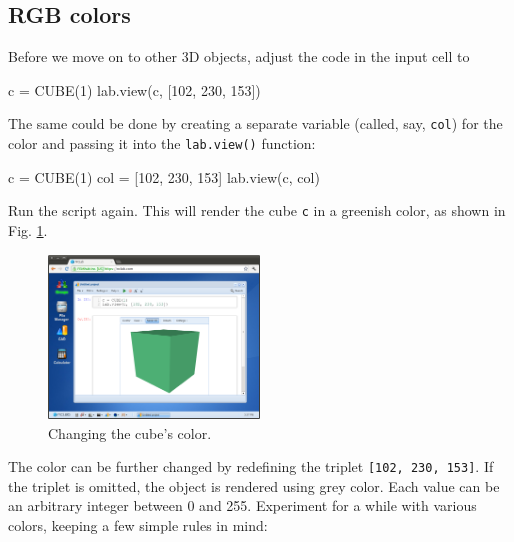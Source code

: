 \subsection{RGB colors}

Before we move on to other 3D objects, adjust the code in the input cell to 
\begin{bluecode}
c = CUBE(1)
lab.view(c, [102, 230, 153])
\end{bluecode}
\noindent
The same could be done by creating a separate variable (called, say, {\tt col})
for the color and passing it into the {\tt lab.view()} function:

\begin{bluecode}
c = CUBE(1)
col = [102, 230, 153]
lab.view(c, col)
\end{bluecode}
Run the script again.
This will render the cube {\tt c} in a greenish color, as shown in 
Fig. \ref{fig:cube2}.

\begin{figure}[!ht]
\begin{center}
\includegraphics[width=0.5\textwidth]{img/cube2.png}
\end{center}
\vspace{-2mm}
\caption{Changing the cube's color.}
\vspace{2mm}
\label{fig:cube2}
\end{figure}
\noindent
The color can be further changed by redefining the triplet {\tt [102, 230, 153]}. 
If the triplet is omitted, the object is rendered using grey color. Each value can 
be an arbitrary integer between 0 and 255. Experiment for a while with various colors, keeping a few 
simple rules in mind:

